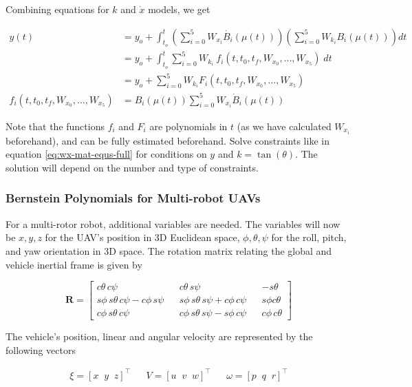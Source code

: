 Combining equations for $k$ and $\dot{x}$ models, we get

\begin{align}
    y(t) &= y_o + \int_{t_o}^{t} \left ( \sum_{i = 0}^{5} W_{x_i} \dot{B_i} (\mu(t)) \right ) \left ( \sum_{i = 0}^{5} W_{k_i} B_i (\mu(t)) \right ) dt 
    \nonumber\\
    &= y_o + \int_{t_o}^{t} \sum_{i=0}^{5} W_{k_i} \: f_i (t, t_0, t_f, W_{x_0}, \dots, W_{x_5}) \; dt
    \nonumber \\
    &= y_o + \sum_{i=0}^{5} W_{k_i} F_i (t, t_0, t_f, W_{x_0}, \dots, W_{x_5})
    \label{eq:t-mix-bernstein-model} \\
    f_i (t, t_0, t_f, W_{x_0}, \dots, W_{x_5}) &= B_i(\mu(t)) \sum_{i=0}^{5} W_{x_i} \dot{B}_i (\mu(t)) \nonumber
\end{align}

Note that the functions $f_i$ and $F_i$ are polynomials in $t$ (as we have calculated $W_{x_i}$ beforehand), and can be fully estimated beforehand.
Solve constraints like in equation \ref{eq:wx-mat-equs-full} for conditions on $y$ and $k = \tan(\theta)$. The solution will depend on the number and type of constraints.

\subsubsection{Bernstein Polynomials for Multi-robot UAVs}

For a multi-rotor robot, additional variables are needed. The variables will now be $x, y, z$ for the UAV's position in 3D Euclidean space, $\phi, \theta, \psi$ for the roll, pitch, and yaw orientation in 3D space.
The rotation matrix relating the global and vehicle inertial frame is given by

\begin{equation*} 
    \mathbf{R} = \begin{bmatrix}
        c\theta\,c\psi && c\theta\,s\psi && -s\theta \\
        s\phi\,s\theta\,c\psi-c\phi\,s\psi && s\phi\,s\theta\,s\psi + c\phi\,c\psi && s\phi c\theta \\
        c\phi\,s\theta\,c\psi && c\phi\,s\theta\,s\psi-s\phi\,c\psi && c\phi\,c\theta
    \end{bmatrix}
\end{equation*}

The vehicle's position, linear and angular velocity are represented by the following vectors

\begin{align*}
    \xi = [x\;\;y\;\;z]^\top && V = [u\;\;v\;\;w]^\top && \omega = [p\;\;q\;\;r]^\top
\end{align*}

